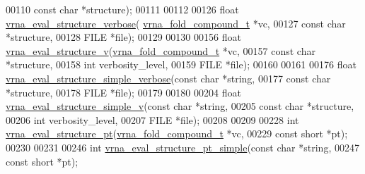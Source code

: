 \begin{DoxyCode}
00110                                  \textcolor{keyword}{const} \textcolor{keywordtype}{char} *structure);
00111 
00112 
00126 \textcolor{keywordtype}{float} \hyperlink{group__eval_ga0928d699d310178f84ee2351034e5cb5}{vrna\_eval\_structure\_verbose}(
      \hyperlink{group__fold__compound_structvrna__fc__s}{vrna\_fold\_compound\_t}  *vc,
00127                                   \textcolor{keyword}{const} \textcolor{keywordtype}{char}            *structure,
00128                                   FILE                  *file);
00129 
00130 
00156 \textcolor{keywordtype}{float} \hyperlink{group__eval_gab12e6b1226227670322150df018734f8}{vrna\_eval\_structure\_v}(\hyperlink{group__fold__compound_structvrna__fc__s}{vrna\_fold\_compound\_t}  *vc,
00157                             \textcolor{keyword}{const} \textcolor{keywordtype}{char}            *structure,
00158                             \textcolor{keywordtype}{int}                   verbosity\_level,
00159                             FILE                  *file);
00160 
00161 
00176 \textcolor{keywordtype}{float} \hyperlink{group__eval_ga4c2895a7dcd756ef2dc7f76db7c4c53e}{vrna\_eval\_structure\_simple\_verbose}(\textcolor{keyword}{const} \textcolor{keywordtype}{char} *\textcolor{keywordtype}{string},
00177                                          \textcolor{keyword}{const} \textcolor{keywordtype}{char} *structure,
00178                                          FILE       *file);
00179 
00180 
00204 \textcolor{keywordtype}{float} \hyperlink{group__eval_gaddb30ac265f1a39557170e7acac4930f}{vrna\_eval\_structure\_simple\_v}(\textcolor{keyword}{const} \textcolor{keywordtype}{char} *\textcolor{keywordtype}{string},
00205                                    \textcolor{keyword}{const} \textcolor{keywordtype}{char} *structure,
00206                                    \textcolor{keywordtype}{int}        verbosity\_level,
00207                                    FILE       *file);
00208 
00209 
00228 \textcolor{keywordtype}{int} \hyperlink{group__eval_gadbd09372ddfd7a450bbd590c96a6bfe4}{vrna\_eval\_structure\_pt}(\hyperlink{group__fold__compound_structvrna__fc__s}{vrna\_fold\_compound\_t} *vc,
00229                            \textcolor{keyword}{const} \textcolor{keywordtype}{short}          *pt);
00230 
00231 
00246 \textcolor{keywordtype}{int} \hyperlink{group__eval_ga0bba59b4d6e53461088666ff4aece7b0}{vrna\_eval\_structure\_pt\_simple}(\textcolor{keyword}{const} \textcolor{keywordtype}{char}  *\textcolor{keywordtype}{string},
00247                                   \textcolor{keyword}{const} \textcolor{keywordtype}{short} *pt);

\end{DoxyCode}
